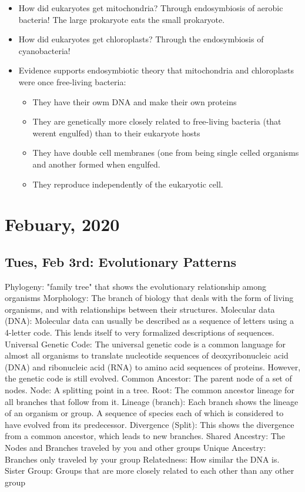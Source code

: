 \documentclass[10pt, oneside]{article}
\begin{document}
\begin{itemize}
\item How did eukaryotes get mitochondria? Through endosymbiosis of aerobic bacteria! The large prokaryote eats the small prokaryote.
\item How did eukaryotes get chloroplasts? Through the endosymbiosis of cyanobacteria!
\item Evidence supports endosymbiotic theory that mitochondria and chloroplasts were once free-living bacteria:
\begin{itemize}
\item They have their owm DNA and make their own proteins
\item They are genetically more closely related to free-living bacteria (that werent engulfed) than to their eukaryote hosts
\item They have double cell membranes (one from being single celled organisms and another formed when engulfed.
\item They reproduce independently of the eukaryotic cell.
\end{itemize}
\end{itemize}


\section{Febuary, 2020}

\subsection{Tues, Feb 3rd: Evolutionary Patterns}
 Phylogeny: "family tree" that shows the evolutionary relationship among organisms
 Morphology: The branch of biology that deals with the form of living organisms, and with relationships between their structures.
 Molecular data (DNA): Molecular data can usually be described as a sequence of letters using a 4-letter code. This lends itself to very formalized descriptions of sequences.
 Universal Genetic Code: The universal genetic code is a common language for almost all organisms to translate nucleotide sequences of deoxyribonucleic acid (DNA) and ribonucleic acid (RNA) to amino acid sequences of proteins. However, the genetic code is still evolved.
 Common Ancestor: The parent node of a set of nodes.
 Node: A splitting point in a tree.
 Root: The common ancestor lineage for all branches that follow from it.
 Lineage (branch): Each branch shows the lineage of an organism or group. A sequence of species each of which is considered to have evolved from its predecessor.
 Divergence (Split): This shows the divergence from a common ancestor, which leads to new branches.
 Shared Ancestry: The Nodes and Branches traveled by you and other groups
 Unique Ancestry: Branches only traveled by your group
 Relatedness: How similar the DNA is.
 Sister Group: Groups that are more closely related to each other than any other group
\end{document}
